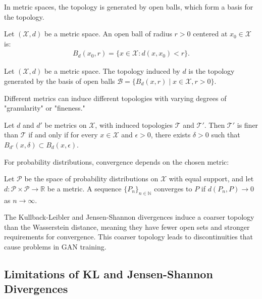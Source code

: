 In metric spaces, the topology is generated by open balls, which form a basis for the topology.

\begin{definition}%
  \label{def:open-ball}
  Let $(\mathcal{X}, d)$ be a metric space. An \textnormal{\sffamily open ball} of radius $r > 0$ centered at $x_0 \in \mathcal{X}$ is:
  \begin{align}
    B_d(x_0, r) = \{ x \in \mathcal{X} : d(x, x_0) < r \}.
  \end{align}
\end{definition}

\begin{definition}%
  \label{def:topology2}
  Let $(\mathcal{X}, d)$ be a metric space. The \textnormal{\sffamily topology induced by} $d$ is the topology generated by the basis of open balls $\mathcal{B} = \{B_d(x, r) \mid x \in \mathcal{X}, r > 0\}$.
\end{definition}

Different metrics can induce different topologies with varying degrees of "granularity" or "fineness."

\begin{theorem}%
  \label{thm:granularity}
  Let $d$ and $d'$ be metrics on $\mathcal{X}$, with induced topologies $\mathcal{T}$ and $\mathcal{T}'$. Then $\mathcal{T}'$ is \textnormal{\sffamily finer} than $\mathcal{T}$ if and only if for every $x \in \mathcal{X}$ and $\epsilon > 0$, there exists $\delta > 0$ such that $B_{d'}(x, \delta) \subset B_d(x, \epsilon)$.
\end{theorem}

For probability distributions, convergence depends on the chosen metric:

\begin{definition}%
  \label{def:convergence-metric-space}
  Let $\mathcal{P}$ be the space of probability distributions on $\mathcal{X}$ with equal support, and let $d: \mathcal{P} \times \mathcal{P} \to \mathbb{R}$ be a metric. A sequence $\{P_n\}_{n \in \mathbb{N}}$ \textnormal{\sffamily converges} to $P$ if $d(P_n, P) \to 0$ as $n \to \infty$.
\end{definition}

The Kullback-Leibler and Jensen-Shannon divergences induce a coarser topology than the Wasserstein distance, meaning they have fewer open sets and stronger requirements for convergence. This coarser topology leads to discontinuities that cause problems in GAN training.

\subsection{Limitations of KL and Jensen-Shannon Divergences}

